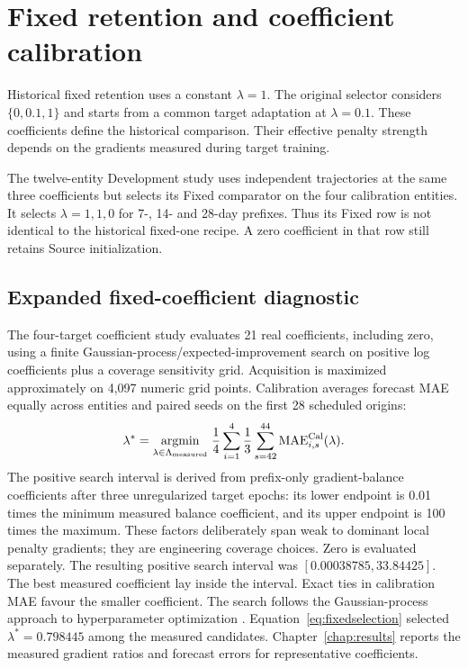 \section{Fixed retention and coefficient calibration}
Historical fixed retention uses a constant $\lambda=1$. The original selector considers $\{0,0.1,1\}$ and starts from a common target adaptation at $\lambda=0.1$. These coefficients define the historical comparison. Their effective penalty strength depends on the gradients measured during target training.

The twelve-entity Development study uses independent trajectories at the same three coefficients but selects its Fixed comparator on the four calibration entities. It selects $\lambda=1,1,0$ for 7-, 14- and 28-day prefixes. Thus its Fixed row is not identical to the historical fixed-one recipe. A zero coefficient in that row still retains Source initialization.

\subsection{Expanded fixed-coefficient diagnostic}
The four-target coefficient study evaluates 21 real coefficients, including zero, using a finite Gaussian-process/expected-improvement search on positive log coefficients plus a coverage sensitivity grid. Acquisition is maximized approximately on 4,097 numeric grid points. Calibration averages forecast MAE equally across entities and paired seeds on the first 28 scheduled origins:
\begin{equation}
\lambda^*=\underset{\lambda\in\Lambda_{\rm measured}}{\operatorname{argmin}}\;
\frac{1}{4}\sum_{i=1}^4\frac{1}{3}\sum_{s=42}^{44}
\operatorname{MAE}^{\rm Cal}_{i,s}(\lambda).
\label{eq:fixedselection}
\end{equation}
The positive search interval is derived from prefix-only gradient-balance coefficients after three unregularized target epochs: its lower endpoint is 0.01 times the minimum measured balance coefficient, and its upper endpoint is 100 times the maximum. These factors deliberately span weak to dominant local penalty gradients; they are engineering coverage choices. Zero is evaluated separately. The resulting positive search interval was $[0.00038785,33.84425]$. The best measured coefficient lay inside the interval. Exact ties in calibration MAE favour the smaller coefficient. The search follows the Gaussian-process approach to hyperparameter optimization \cite{snoek2012}.
Equation~\eqref{eq:fixedselection} selected $\lambda^*=0.798445$ among the measured candidates. Chapter~\ref{chap:results} reports the measured gradient ratios and forecast errors for representative coefficients.


